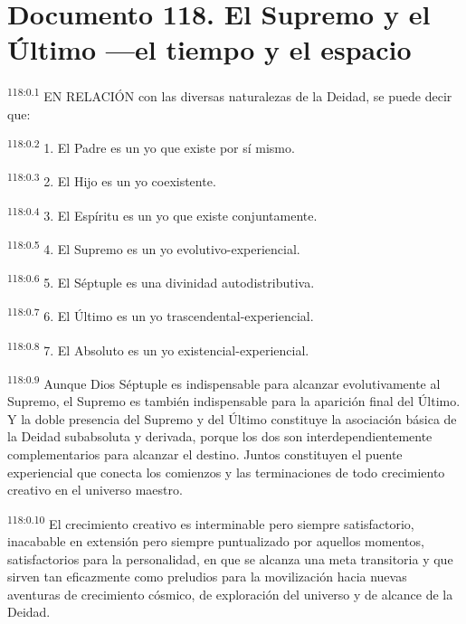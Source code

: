\chapter{Documento 118. El Supremo y el Último ---el tiempo y el espacio}
\par
\textsuperscript{118:0.1} EN RELACIÓN con las diversas naturalezas de la Deidad, se puede decir que:

\par
\textsuperscript{118:0.2} 1. El Padre es un yo que existe por sí mismo.

\par
\textsuperscript{118:0.3} 2. El Hijo es un yo coexistente.

\par
\textsuperscript{118:0.4} 3. El Espíritu es un yo que existe conjuntamente.

\par
\textsuperscript{118:0.5} 4. El Supremo es un yo evolutivo-experiencial.

\par
\textsuperscript{118:0.6} 5. El Séptuple es una divinidad autodistributiva.

\par
\textsuperscript{118:0.7} 6. El Último es un yo trascendental-experiencial.

\par
\textsuperscript{118:0.8} 7. El Absoluto es un yo existencial-experiencial.

\par
\textsuperscript{118:0.9} Aunque Dios Séptuple es indispensable para alcanzar evolutivamente al Supremo, el Supremo es también indispensable para la aparición final del Último. Y la doble presencia del Supremo y del Último constituye la asociación básica de la Deidad subabsoluta y derivada, porque los dos son interdependientemente complementarios para alcanzar el destino. Juntos constituyen el puente experiencial que conecta los comienzos y las terminaciones de todo crecimiento creativo en el universo maestro.

\par
\textsuperscript{118:0.10} El crecimiento creativo es interminable pero siempre satisfactorio, inacabable en extensión pero siempre puntualizado por aquellos momentos, satisfactorios para la personalidad, en que se alcanza una meta transitoria y que sirven tan eficazmente como preludios para la movilización hacia nuevas aventuras de crecimiento cósmico, de exploración del universo y de alcance de la Deidad.

